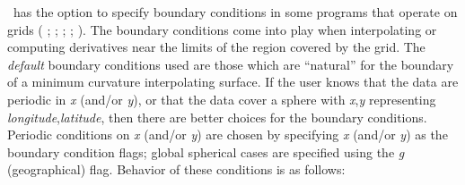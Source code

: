 \GMT\ has the option to specify boundary conditions in some programs
that operate on grids ( ; 
;  ;  ;
 ).  The boundary conditions come into play
when interpolating or computing derivatives near the limits of the
region covered by the grid. The \emph{default} boundary
conditions used are those which are ``natural'' for the boundary
of a minimum curvature interpolating surface.
If the user knows that the data are periodic in \emph{x} (and/or
\emph{y}), or that the data cover a sphere with \emph{x},\emph{y}
representing \emph{longitude},\emph{latitude}, then there are better
choices for the boundary conditions.
Periodic conditions on \emph{x} (and/or \emph{y}) are chosen by
specifying \emph{x} (and/or \emph{y}) as the boundary condition flags;
global spherical cases are specified using the \emph{g} (geographical)
flag.  Behavior of these conditions is as follows:

